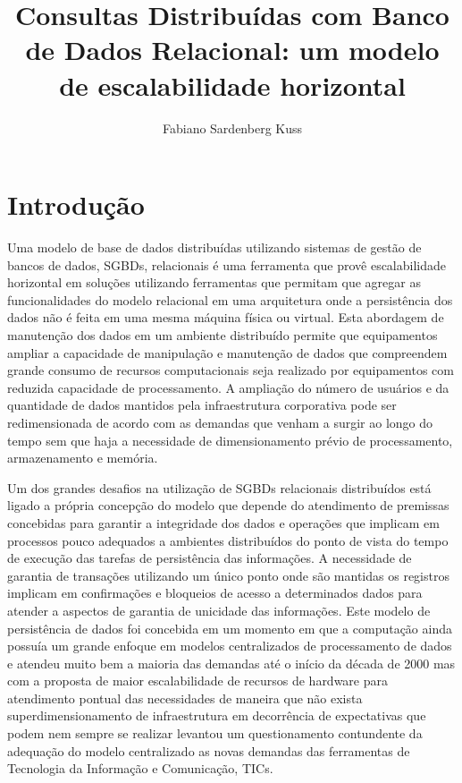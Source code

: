 \documentclass[12pt, a4paper]{article}
\begin{document}
\onehalfspace

\title{Consultas Distribuídas com Banco de Dados Relacional: um modelo de escalabilidade horizontal}
\author{Fabiano Sardenberg Kuss}





\section{Introdução}

Uma modelo de base de dados distribuídas utilizando sistemas de gestão de bancos de dados, SGBDs, relacionais é uma
ferramenta que provê escalabilidade horizontal em soluções utilizando ferramentas que permitam que agregar 
as funcionalidades do modelo relacional em uma arquitetura onde a persistência dos dados não é feita em
uma mesma máquina física ou virtual. Esta abordagem de manutenção dos dados em um ambiente distribuído 
permite que equipamentos ampliar a capacidade de manipulação e manutenção de dados que compreendem grande
consumo de recursos computacionais seja realizado por equipamentos com reduzida capacidade de processamento.
A ampliação do número de usuários e da quantidade de dados mantidos pela infraestrutura corporativa pode
ser redimensionada de acordo com as demandas que venham a surgir ao longo do tempo sem que haja a necessidade
de dimensionamento prévio de processamento, armazenamento e memória.

Um dos grandes desafios na utilização de SGBDs relacionais distribuídos está ligado a própria concepção
do modelo que depende do atendimento de premissas concebidas para garantir a integridade dos dados e operações
que implicam em processos pouco adequados a ambientes distribuídos do ponto de vista do tempo de execução
das tarefas de persistência das informações. A necessidade de garantia de transações utilizando um único 
ponto onde são mantidas os registros implicam em confirmações e bloqueios de acesso a determinados dados
para atender a aspectos de garantia de unicidade das informações. Este modelo de persistência de dados
foi concebida em um momento em que a computação ainda possuía um grande enfoque em modelos centralizados
de processamento de dados e atendeu muito bem a maioria das demandas até o início da década de 2000 \cite{kossmann2000state} mas
com a proposta de maior escalabilidade de recursos de hardware para atendimento pontual das necessidades
de maneira que não exista superdimensionamento de infraestrutura em decorrência de expectativas que podem
nem sempre se realizar levantou um questionamento contundente da adequação do modelo centralizado as novas
demandas das ferramentas de Tecnologia da Informação e Comunicação, TICs.
\end{document}
